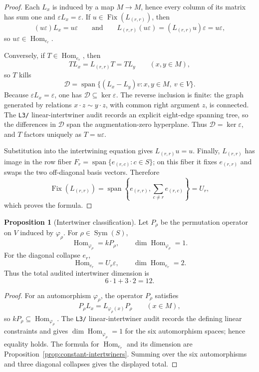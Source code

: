 \documentclass[11pt]{article}
\theoremstyle{definition}
\newtheorem{proposition}[theorem]{Proposition}
\begin{document}
\begin{proof}
Each \(L_x\) is induced by a map \(M\to M\), hence every column of its matrix
has sum one and \(\varepsilon L_x=\varepsilon\).  If
\(u\in\operatorname{Fix}(L_{(r,r)})\), then
\[
(u\varepsilon)L_x=u\varepsilon
\qquad\text{and}\qquad
L_{(r,r)}(u\varepsilon)=(L_{(r,r)}u)\varepsilon=u\varepsilon,
\]
so \(u\varepsilon\in\operatorname{Hom}_{e_r}\).

Conversely, if \(T\in\operatorname{Hom}_{e_r}\), then
\[
T L_x=L_{(r,r)}T=T L_y
\qquad(x,y\in M),
\]
so \(T\) kills
\[
\mathcal D=\operatorname{span}\{(L_x-L_y)v:x,y\in M,\ v\in V\}.
\]
Because \(\varepsilon L_x=\varepsilon\), one has
\(\mathcal D\subseteq\ker\varepsilon\).  The reverse inclusion is finite:
the graph generated by relations \(x\cdot z\sim y\cdot z\), with common
right argument \(z\), is connected.  The \texttt{L3/} linear-intertwiner
audit records an explicit eight-edge spanning tree, so the differences in
\(\mathcal D\) span the augmentation-zero hyperplane.  Thus \(\mathcal D=\ker\varepsilon\), and
\(T\) factors uniquely as \(T=u\varepsilon\).

Substitution into the intertwining equation gives \(L_{(r,r)}u=u\).  Finally,
\(L_{(r,r)}\) has image in the row fiber
\(F_r=\operatorname{span}\{e_{(r,c)}:c\in S\}\); on this fiber it fixes
\(e_{(r,r)}\) and swaps the two off-diagonal basis vectors.  Therefore
\[
\operatorname{Fix}(L_{(r,r)})
=
\operatorname{span}\left\{e_{(r,r)},\sum_{c\ne r}e_{(r,c)}\right\}=U_r,
\]
which proves the formula.
\end{proof}

\begin{proposition}[Intertwiner classification]
\label{prop:intertwiner-classification}
Let \(P_\rho\) be the permutation operator on \(V\) induced by
\(\varphi_\rho\).  For \(\rho\in\operatorname{Sym}(S)\),
\[
\operatorname{Hom}_{\varphi_\rho}=kP_\rho,
\qquad
\dim\operatorname{Hom}_{\varphi_\rho}=1.
\]
For the diagonal collapse \(e_r\),
\[
\operatorname{Hom}_{e_r}=U_r\varepsilon,
\qquad
\dim\operatorname{Hom}_{e_r}=2.
\]
Thus the total audited intertwiner dimension is
\[
6\cdot1+3\cdot2=12.
\]
\end{proposition}

\begin{proof}
For an automorphism \(\varphi_\rho\), the operator \(P_\rho\) satisfies
\[
P_\rho L_x=L_{\varphi_\rho(x)}P_\rho
\qquad(x\in M),
\]
so \(kP_\rho\subseteq\operatorname{Hom}_{\varphi_\rho}\).  The
\texttt{L3/} linear-intertwiner audit records the defining linear constraints
and gives \(\dim\operatorname{Hom}_{\varphi_\rho}=1\) for the six automorphism spaces;
hence equality holds.  The formula for \(\operatorname{Hom}_{e_r}\) and its
dimension are Proposition~\ref{prop:constant-intertwiners}.  Summing over the
six automorphisms and three diagonal collapses gives the displayed total.
\end{proof}
\end{document}
